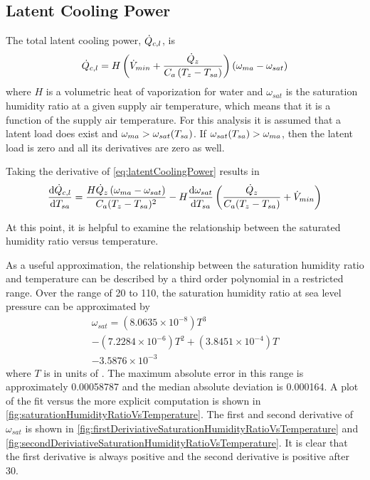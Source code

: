 \subsection{Latent Cooling Power}

The total latent cooling power, \(\dot{Q}_{c,l}\), is 
\begin{equation}\label{eq:latentCoolingPower}
   \dot{Q}_{c,l} = H \left(\dot{V}_{min} + \frac{\dot{Q}_{z}}{C_{a}\left(T_{z}-T_{sa}\right)} \right) \left( \omega_{ma} -
   \omega_{sat} \right) 
\end{equation}
where \(H\) is a volumetric heat of vaporization for water and \(\omega_{sat}\)
is the saturation humidity ratio at a given supply air temperature, which means
that it is a function of the supply air temperature.  For this analysis it is
assumed that a latent load does exist and \(\omega_{ma} >
\omega_{sat}(T_{sa}{})\). If \(\omega_{sat}(T_{sa}{}) > \omega_{ma}\), then
the latent load is zero and all its derivatives are zero as well.

Taking the derivative of  \ref{eq:latentCoolingPower} results in
\begin{equation}\label{eq:firstDerivativeLatentPower}
    \dv{\dot{Q}_{c,l}}{T_{sa}{}} = \frac{H \dot{Q}_{z} \left(\omega_{ma} -\omega_{sat} \right)}{C_{a} (T_{z}-T_{sa}{})^2} 
    -H \dv{\omega_{sat}}{T_{sa}{}} \left(\frac{\dot{Q}_{z}}{C_{a} (T_{z}-T_{sa}{})}+\dot{V}_{min}\right) 
\end{equation}

At this point, it is helpful to examine the relationship between the
saturated humidity ratio versus temperature. 

As a useful approximation, the relationship between the saturation
humidity ratio and temperature can be described by a third order
polynomial in a restricted range. Over the range of \SI{20}{\degreeF} to
\SI{110}{\degreeF}, the saturation humidity ratio at sea level pressure
can be approximated by
\begin{multline}
    \omega_{sat} = \left(8.0635 \times 10^{-8}\right) T^3 \\ 
    - \left(7.2284 \times 10^{-6}\right)  T^2 + \left(3.8451\times 10^{-4}\right) T \\
    -  3.5876\times 10^{-3}
\end{multline}
where \(T\) is in units of \si{\degreeF}. The maximum absolute error in
this range is approximately \num[group-separator={ }]{0.00058787} and the median absolute
deviation is \num[group-separator={ }]{0.000164}. A plot of the fit
versus the more explicit computation is shown in \figref{}
\ref{fig:saturationHumidityRatioVsTemperature}. The first and second
derivative of \(\omega_{sat}\) is shown in \figref{}
\ref{fig:firstDeriviativeSaturationHumidityRatioVsTemperature} and
\figref{}
\ref{fig:secondDeriviativeSaturationHumidityRatioVsTemperature}. It is
clear that the first derivative is always positive and the second
derivative is positive after \SI{30}{\degreeF}.

